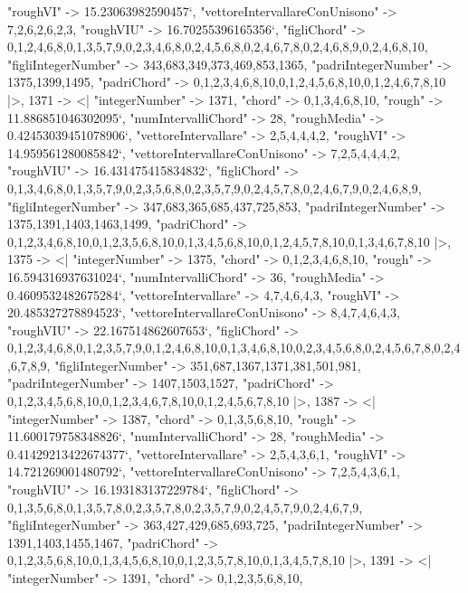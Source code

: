 \documentclass[
]{article}
\begin{document}
\begin{DatasetVerbatim}
    "roughVI" -> 15.23063982590457`,
    "vettoreIntervallareConUnisono" -> {7,2,6,2,6,2,3},
    "roughVIU" -> 16.70255396165356`,
    "figliChord" -> {{0,1,2,4,6,8},{0,1,3,5,7,9},{0,2,3,4,6,8},{0,2,4,5,6,8},{0,2,4,6,7,8},{0,2,4,6,8,9},{0,2,4,6,8,10}},
    "figliIntegerNumber" -> {343,683,349,373,469,853,1365},
    "padriIntegerNumber" -> {1375,1399,1495},
    "padriChord" -> {{0,1,2,3,4,6,8,10},{0,1,2,4,5,6,8,10},{0,1,2,4,6,7,8,10}}
  |>,
  1371 -> <|
    "integerNumber" -> 1371,
    "chord" -> {0,1,3,4,6,8,10},
    "rough" -> 11.886851046302095`,
    "numIntervalliChord" -> 28,
    "roughMedia" -> 0.42453039451078906`,
    "vettoreIntervallare" -> {2,5,4,4,4,2},
    "roughVI" -> 14.959561280085842`,
    "vettoreIntervallareConUnisono" -> {7,2,5,4,4,4,2},
    "roughVIU" -> 16.431475415834832`,
    "figliChord" -> {{0,1,3,4,6,8},{0,1,3,5,7,9},{0,2,3,5,6,8},{0,2,3,5,7,9},{0,2,4,5,7,8},{0,2,4,6,7,9},{0,2,4,6,8,9}},
    "figliIntegerNumber" -> {347,683,365,685,437,725,853},
    "padriIntegerNumber" -> {1375,1391,1403,1463,1499},
    "padriChord" -> {{0,1,2,3,4,6,8,10},{0,1,2,3,5,6,8,10},{0,1,3,4,5,6,8,10},{0,1,2,4,5,7,8,10},{0,1,3,4,6,7,8,10}}
  |>,
  1375 -> <|
    "integerNumber" -> 1375,
    "chord" -> {0,1,2,3,4,6,8,10},
    "rough" -> 16.594316937631024`,
    "numIntervalliChord" -> 36,
    "roughMedia" -> 0.4609532482675284`,
    "vettoreIntervallare" -> {4,7,4,6,4,3},
    "roughVI" -> 20.485327278894523`,
    "vettoreIntervallareConUnisono" -> {8,4,7,4,6,4,3},
    "roughVIU" -> 22.167514862607653`,
    "figliChord" -> {{0,1,2,3,4,6,8},{0,1,2,3,5,7,9},{0,1,2,4,6,8,10},{0,1,3,4,6,8,10},{0,2,3,4,5,6,8},{0,2,4,5,6,7,8},{0,2,4,6,7,8,9}},
    "figliIntegerNumber" -> {351,687,1367,1371,381,501,981},
    "padriIntegerNumber" -> {1407,1503,1527},
    "padriChord" -> {{0,1,2,3,4,5,6,8,10},{0,1,2,3,4,6,7,8,10},{0,1,2,4,5,6,7,8,10}}
  |>,
  1387 -> <|
    "integerNumber" -> 1387,
    "chord" -> {0,1,3,5,6,8,10},
    "rough" -> 11.600179758348826`,
    "numIntervalliChord" -> 28,
    "roughMedia" -> 0.41429213422674377`,
    "vettoreIntervallare" -> {2,5,4,3,6,1},
    "roughVI" -> 14.721269001480792`,
    "vettoreIntervallareConUnisono" -> {7,2,5,4,3,6,1},
    "roughVIU" -> 16.193183137229784`,
    "figliChord" -> {{0,1,3,5,6,8},{0,1,3,5,7,8},{0,2,3,5,7,8},{0,2,3,5,7,9},{0,2,4,5,7,9},{0,2,4,6,7,9}},
    "figliIntegerNumber" -> {363,427,429,685,693,725},
    "padriIntegerNumber" -> {1391,1403,1455,1467},
    "padriChord" -> {{0,1,2,3,5,6,8,10},{0,1,3,4,5,6,8,10},{0,1,2,3,5,7,8,10},{0,1,3,4,5,7,8,10}}
  |>,
  1391 -> <|
    "integerNumber" -> 1391,
    "chord" -> {0,1,2,3,5,6,8,10},

\end{DatasetVerbatim}
\end{document}
